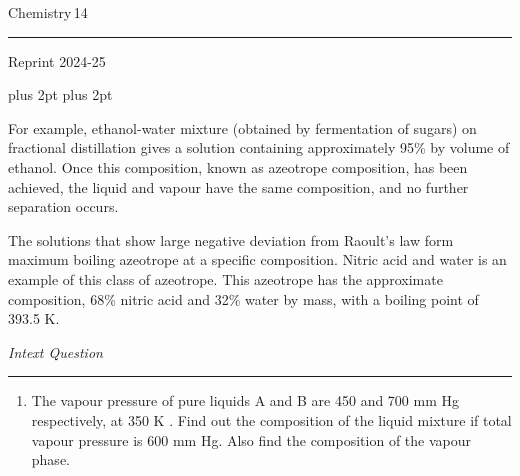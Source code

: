 \documentclass[11pt,a4paper]{article}
\renewcommand{\normalsize}{\fontsize{10.5bp}{12.7bp}\selectfont\abovedisplayskip=4pt plus 2pt\belowdisplayskip=4pt plus 2pt\abovedisplayshortskip=2pt\belowdisplayshortskip=2pt}
\begin{document}
\vfill
\noindent\begin{minipage}{0.3\textwidth}
{\color{gray}Chemistry}\hspace{6pt}\colorbox{Goldenrod1}{\color{gray}\,14\,}\\[-6pt]
{\color{Goldenrod1}\rule{\linewidth}{1pt}}
\end{minipage}
\begin{center}
{\sffamily\small Reprint 2024-25}
\end{center}

\normalsize


\noindent\hfill\begin{minipage}[t]{0.765\textwidth}
For example, ethanol-water mixture (obtained by fermentation of sugars) on fractional distillation gives a solution containing approximately 95\% by volume of ethanol. Once this composition, known as azeotrope composition, has been achieved, the liquid and vapour have the same composition, and no further separation occurs.

\hspace*{1.5em}The solutions that show large negative deviation from Raoult's law form maximum boiling azeotrope at a specific composition. Nitric acid and water is an example of this class of azeotrope. This azeotrope has the approximate composition, 68\% nitric acid and 32\% water by mass, with a boiling point of 393.5 K.
\end{minipage}

\vspace{6pt}
\begin{tcolorbox}[enhanced,colback=white,colframe=gray!40,boxrule=0.8pt,arc=2mm,left=14pt,right=34pt,top=4pt,bottom=4pt,boxsep=0pt,width=0.94\textwidth,drop fuzzy shadow=gray!40,overlay={\fill[salmon] ([xshift=-14pt]frame.south east) rectangle (frame.north east);}]
\hfill{\large\itshape Intext Question}\\[-4pt]
\mbox{}\hfill{\color{salmon}\rule{0.30\linewidth}{0.8pt}}
\begin{enumerate}[label=\textbf{1.\arabic*},leftmargin=30pt,topsep=2pt,start=8]
\item The vapour pressure of pure liquids A and B are 450 and 700 mm Hg respectively, at 350 K . Find out the composition of the liquid mixture if total vapour pressure is 600 mm Hg. Also find the composition of the vapour phase.
\end{enumerate}
\end{tcolorbox}
\end{document}
